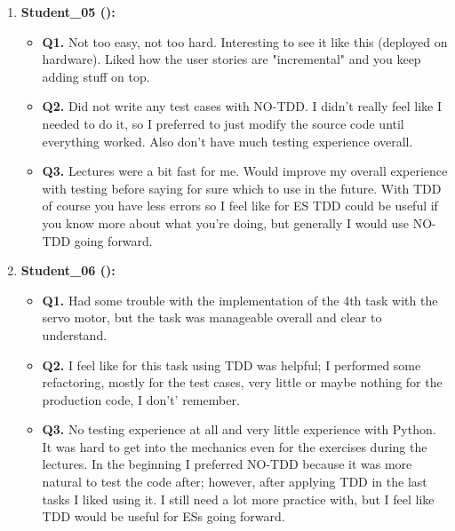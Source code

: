 \begin{enumerate}
    \item \textbf{Student\_05 (\tdd):}
    \begin{itemize}
        \item \textbf{Q1.} Not too easy, not too hard. Interesting to see it like this (deployed on hardware). Liked how the user stories are "incremental" and you keep adding stuff on top.
        \item \textbf{Q2.} Did not write any test cases with NO-TDD. I didn’t really feel like I needed to do it, so I preferred to just modify the source code until everything worked. Also don't have much testing experience overall.
        \item \textbf{Q3.} Lectures were a bit fast for me. Would improve my overall experience with testing before saying for sure which to use in the future.  With TDD of course you have less errors so I feel like for ES TDD could be useful if you know more about what you're doing, but generally I would use NO-TDD going forward.
    \end{itemize}

    \item \textbf{Student\_06 (\tdd):}
    \begin{itemize}
        \item \textbf{Q1.} Had some trouble with the implementation of the 4th task with the servo motor, but the task was manageable overall and clear to understand.
        \item \textbf{Q2.} I feel like for this task using TDD was helpful; I performed some refactoring, mostly for the test cases, very little or maybe nothing for the production code, I don’t’ remember.
        \item \textbf{Q3.} No testing experience at all and very little experience with Python. It was hard to get into the mechanics even for the exercises during the lectures. In the beginning I preferred NO-TDD because it was more natural to test the code after; however, after applying TDD in the last tasks I liked using it. I still need a lot more practice with, but I feel like TDD would be useful for ESs going forward.
    \end{itemize}


\end{enumerate}
